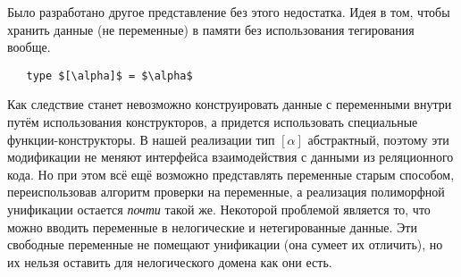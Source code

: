 
Было разработано другое представление без этого недостатка.
Идея в том, чтобы хранить данные (не переменные) в памяти без использования тегирования вообще.

\begin{lstlisting}
   type $[\alpha]$ = $\alpha$
\end{lstlisting}

\noindent Как следствие станет невозможно конструировать данные с переменными внутри путём использования конструкторов,
а придется использовать специальные функции-конструк\-торы.
В нашей реализации тип $[\alpha]$ абстрактный, поэтому эти модификации не меняют интерфейса взаимодействия с данными из реляционного кода.
Но при этом всё ещё возможно представлять переменные старым способом, переиспользовав алгоритм проверки на переменные,
а реализация полиморфной унификации остается \emph{почти} такой же.
Некоторой проблемой является то, что можно вводить переменные в нелогические и нетегированные данные.
Эти свободные переменные не помещают унификации (она сумеет их отличить), но их нельзя оставить для нелогического домена как они есть.


